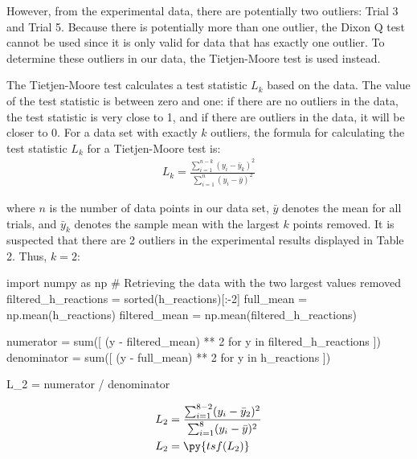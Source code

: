 \documentclass[12pt, notitlepage, letterpaper]{report}
\begin{document}
However, from the experimental data, there are potentially two outliers: Trial 3 and Trial 5. Because there is potentially more than one outlier, the Dixon Q test cannot be used since it is only valid for data that has exactly one outlier. To determine these outliers in our data, the Tietjen-Moore test is used instead.

The Tietjen-Moore test calculates a test statistic $L_k$ based on the data. The value of the test statistic is between zero and one: if there are no outliers in the data, the test statistic is very close to 1, and if there are outliers in the data, it will be closer to 0. For a data set with exactly $k$ outliers, the formula for calculating the test statistic $L_k$ for a Tietjen-Moore test is:
\begin{align*}
	L_k = \frac{\sum_{i=1}^{n-k}(y_i-\bar{y}_k)^2}{\sum_{i=1}^{n}(y_i-\bar{y})^2}
\end{align*}

where $n$ is the number of data points in our data set, $\bar{y}$ denotes the mean for all trials, and $\bar{y}_k$ denotes the sample mean with the largest $k$ points removed. It is suspected that there are 2 outliers in the experimental results displayed in Table 2. Thus, $k = 2$:
%
\begin{pycode}
import numpy as np
# Retrieving the data with the two largest values removed
filtered_h_reactions = sorted(h_reactions)[:-2]
full_mean = np.mean(h_reactions)
filtered_mean = np.mean(filtered_h_reactions)

numerator = sum([
	(y - filtered_mean) ** 2 for y in filtered_h_reactions
])
denominator = sum([
	(y - full_mean) ** 2 for y in h_reactions
])

L_2 = numerator / denominator
\end{pycode}
%
\begin{align*}
	L_2 & = \frac{\sum_{i=1}^{8-2}(y_i-\bar{y}_2)^2}{\sum_{i=1}^{8}(y_i-\bar{y})^2} \\
	L_2 & = \py{tsf(L_2)}
\end{align*}
\end{document}

